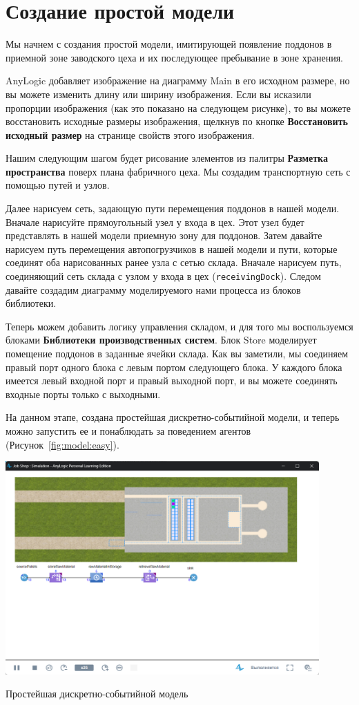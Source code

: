 \section{Создание простой модели}
Мы начнем с создания простой модели, имитирующей появление поддонов в
приемной зоне заводского цеха и их последующее пребывание в зоне хранения.\par
AnyLogic добавляет изображение на диаграмму Main в его исходном размере, но
вы можете изменить длину или ширину изображения. Если вы исказили
пропорции изображения (как это показано на следующем рисунке), то вы
можете восстановить исходные размеры изображения, щелкнув по кнопке
\textbf{Восстановить исходный размер} на странице свойств
этого изображения.\par
Нашим следующим шагом будет рисование элементов из палитры \textbf{Разметка
пространства} поверх плана фабричного цеха. Мы создадим транспортную сеть с
помощью путей и узлов.\par
Далее нарисуем сеть, задающую пути перемещения поддонов в нашей
модели. Вначале нарисуйте прямоугольный узел у входа в цех. Этот узел будет
представлять в нашей модели приемную зону для поддонов.
Затем давайте нарисуем путь перемещения автопогрузчиков в нашей модели
и пути, которые соединят оба нарисованных
ранее узла с сетью склада. Вначале нарисуем путь, соединяющий сеть
склада с узлом у входа в цех (\texttt{receivingDock}). Следом
давайте создадим диаграмму моделируемого нами процесса из блоков
библиотеки.\par
Теперь можем добавить логику
управления складом, и для того мы воспользуемся блоками \textbf{Библиотеки
производственных систем}. Блок Store моделирует помещение поддонов
в заданные ячейки склада.
Как вы заметили, мы соединяем правый порт одного блока с левым портом
следующего блока. У каждого блока имеется левый входной порт и правый
выходной порт, и вы можете соединять входные порты только с выходными.\par

На данном этапе, создана простейшая дискретно-событийной модели, и теперь можно
запустить ее и понаблюдать за поведением агентов
(Рисунок~\ref{fig:model:easy}).

\begin{image}
	\includegraphics[width=0.9\textwidth]{2023-04-02_14-52-52}
	\caption{Простейшая дискретно-событийной модель}
	\label{fig:model:easy}
\end{image}

